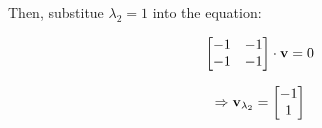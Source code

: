 \documentclass{article}
\begin{document}
Then, substitue $\lambda_2=1$ into the equation:

\[
\begin{bmatrix}
    -1 & -1\\
    -1 & -1
\end{bmatrix}
\cdot \vb{v}=0
\]

\[
\Rightarrow \vb{v}_{\lambda_2}=
\begin{bmatrix}
    -1\\
    1
\end{bmatrix}
\]

\section{}










\end{document}
